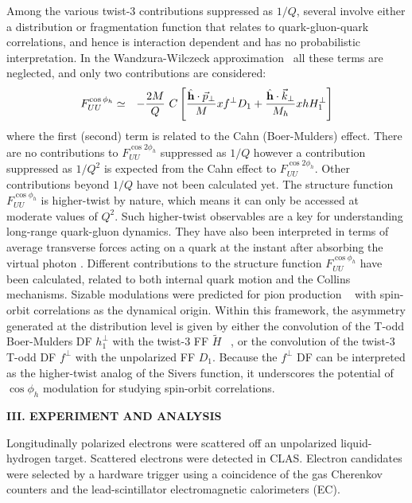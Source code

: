 \documentclass[aps,prl,twocolumn,showpacs,superscriptaddress,groupedaddress]{revtex4-1}  %
\newcommand{\FUUc}{F_{UU}^{\cos\phi_h}}
\newcommand{\FUUcc}{F_{UU}^{\cos2\phi_h}}
\newcommand{\kt}{\vec{k}_\perp}
\newcommand{\pt}{\vec{p}_\perp}
\newcommand{\ph}{\phi_h}
\begin{document}
Among the various twist-3 contributions suppressed as $1/Q$, several involve
either a distribution or fragmentation function that relates to
quark-gluon-quark correlations, and hence is interaction dependent and has no probabilistic
interpretation. In the Wandzura-Wilczeck approximation~\cite{Wandzura:1977qf}
all these terms are neglected, and only two contributions are considered: %
\begin{eqnarray} \nonumber
\label{Eq:cosphi}
\FUUc & \simeq & -\frac{2M}{Q}\  C\left[\frac{ \hat{\bf h} \cdot \pt}{M} xf^\perp D_1 +
\frac{\hat{\bf h} \cdot \kt}{M_h} 
xh H_1^\perp \right] \\
\end{eqnarray}
where the first (second) term is related to the Cahn (Boer-Mulders) effect.
There are no contributions to $\FUUcc$ suppressed as $1/Q$ however a contribution suppressed as $1/Q^2$ is expected from the Cahn effect to $\FUUcc$.
Other contributions beyond $1/Q$ have not been calculated yet.
The structure function $F^{\cos \ph}_{UU}$ is higher-twist by nature, which means it can only be accessed at moderate values of $Q^2$.
Such higher-twist observables are a key for understanding long-range quark-gluon dynamics.
They have also been interpreted in terms of average transverse forces acting on a quark at the instant after absorbing the virtual photon \cite{Burkardt:2008vd}.
Different contributions to the structure function  $F^{\cos \ph}_{UU}$ have been calculated, related to both internal quark motion and the Collins mechanisms.
Sizable modulations  were predicted for pion production ~\cite{Anselmino:2005nn} with spin-orbit correlations   as the dynamical origin.
Within this framework, the asymmetry generated at the distribution level is given by either the convolution of the T-odd Boer-Mulders DF $h_1^{\perp}$ with the twist-3 FF $\tilde{H}$ ~\cite{Bacchetta:2006tn}, or the convolution of the  twist-3 T-odd DF $f^\perp$ with the unpolarized FF $D_1$\cite{Metz:2004je}.
Because the $f^\perp$ DF can be interpreted as the higher-twist analog of the Sivers function, it underscores the potential of $\cos\phi_h$ modulation for studying spin-orbit correlations.


\begin{center}
\textbf{III. EXPERIMENT AND ANALYSIS} \par
\end{center}
Longitudinally polarized electrons were scattered off an unpolarized liquid-hydrogen target. 
Scattered electrons were detected in CLAS.
Electron candidates were selected by a hardware trigger using a coincidence of the gas Cherenkov counters and the lead-scintillator electromagnetic calorimeters (EC). 
\end{document}
